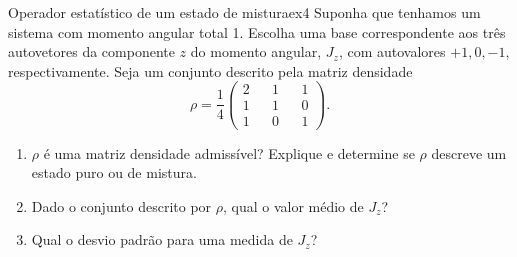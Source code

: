 \begin{exercício}{Operador estatístico de um estado de mistura}{ex4}
    Suponha que tenhamos um sistema com momento angular total 1. Escolha uma base correspondente aos três autovetores da componente \(z\) do momento angular, \(J_z\), com autovalores \(+1, 0, -1\), respectivamente. Seja um conjunto descrito pela matriz densidade
    \begin{equation*}
        \rho = \frac14 \begin{pmatrix}
           2 && 1 && 1\\
           1 && 1 && 0\\
           1 && 0 && 1
        \end{pmatrix}.
    \end{equation*}
    \begin{enumerate}[label=(\alph*)]
        \item \(\rho\) é uma matriz densidade admissível? Explique e determine se \(\rho\) descreve um estado puro ou de mistura.
        \item Dado o conjunto descrito por \(\rho\), qual o valor médio de \(J_z\)?
        \item Qual o desvio padrão para uma medida de \(J_z\)?
    \end{enumerate}
\end{exercício}
